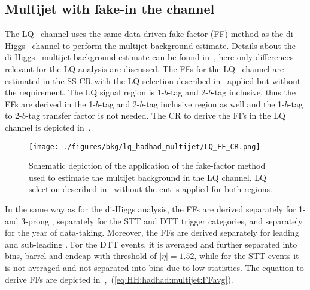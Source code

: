 \FloatBarrier

\subsection{Multijet with fake-\tauhad in the \hadhad channel}

The LQ \hadhad\ channel uses the same data-driven fake-factor (FF) method as the di-Higgs \hadhad\ channel to perform the multijet background 
estimate. Details about the di-Higgs \hadhad\ multijet background estimate can be found in~, here only differences 
relevant for the LQ analysis are discussed. The FFs for the LQ \hadhad\ channel are estimated in the SS CR with the LQ \hadhad selection described 
in~ applied but without the \MET requirement. The LQ signal region is 1-$b$-tag and 2-$b$-tag inclusive, thus the FFs are 
derived in the 1-$b$-tag and 2-$b$-tag inclusive region as well and the 1-$b$-tag to 2-$b$-tag transfer factor is not needed. The CR to derive the FFs 
in the LQ \hadhad channel is depicted in~. 

\begin{figure}
\centering
\texttt{[image: ./figures/bkg/lq\_hadhad\_multijet/LQ\_FF\_CR.png]}
\caption{Schematic depiction of the application of the fake-factor method used to estimate the multijet background in the LQ \hadhad channel. LQ \hadhad selection described in~ without the \MET cut is applied for both regions.}
\label{fig:hadhad_FF_CR}
\end{figure}

In the same way as for the di-Higgs analysis, the FFs are derived separately for 1- and 3-prong \tauhad, separately for the STT and DTT trigger 
categories, and separately for the year of data-taking. Moreover, the FFs are derived separately for leading and sub-leading \tauhad. For the 
DTT events, it is averaged and further separated into \tauhad \pT bins, barrel and endcap with threshold of $|\eta| = 1.52$, while for the STT 
events it is not averaged and not separated into \tauhad \pT bins due to low statistics. The equation to derive FFs are depicted in~,~(\ref{eq:HH:hadhad:multijet:FFavg}).

